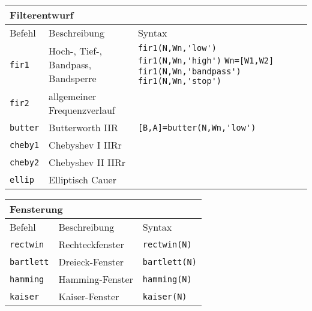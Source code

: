 \begin{tabular}{lp{5cm}p{2.2cm}}
\multicolumn{3}{l}{\textbf{Filterentwurf}} \\\toprule
Befehl & Beschreibung & Syntax \\ \midrule
\verb|fir1| & Hoch-, Tief-, Bandpass, Bandsperre & \verb|fir1(N,Wn,'low')|
 \verb|fir1(N,Wn,'high')| 
 \verb|Wn=[W1,W2]| \verb|fir1(N,Wn,'bandpass')| 
 \verb|fir1(N,Wn,'stop')|\\ 
\verb|fir2| & allgemeiner Frequenzverlauf & \\ 
\verb|butter| & Butterworth IIR & \verb|[B,A]=butter(N,Wn,'low')| \\ 
\verb|cheby1| & Chebyshev I IIRr & \\
\verb|cheby2| & Chebyshev II IIRr & \\ 
\verb|ellip| & Elliptisch Cauer & \\\bottomrule
\end{tabular} 

\begin{tabular}{lp{5cm}p{2.2cm}}
\multicolumn{3}{l}{\textbf{Fensterung}} \\\toprule
Befehl & Beschreibung & Syntax \\ \midrule
\verb|rectwin| & Rechteckfenster & \verb|rectwin(N)| \\ 
\verb|bartlett| & Dreieck-Fenster & \verb|bartlett(N)|\\ 
\verb|hamming| & Hamming-Fenster & \verb|hamming(N)| \\ 
\verb|kaiser| & Kaiser-Fenster & \verb|kaiser(N)| \\ \bottomrule
\end{tabular} 